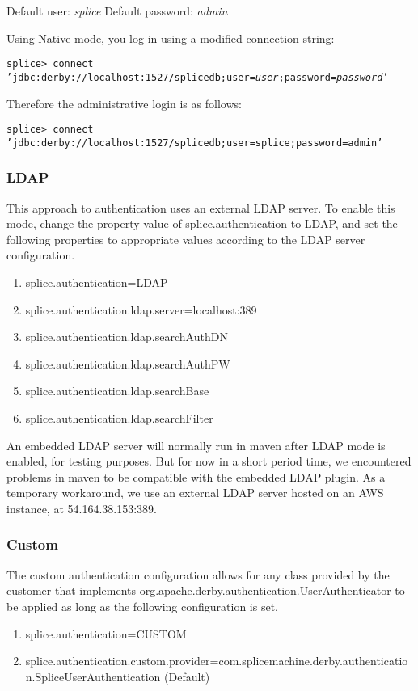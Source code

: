 Default user:  \emph{splice}    
Default password: \emph{admin}

Using Native mode, you log in using a modified connection string:

\texttt{splice> connect 'jdbc:derby://localhost:1527/splicedb;user=\emph{user};password=\emph{password}'}

Therefore the administrative login is as follows:

\texttt{splice> connect 'jdbc:derby://localhost:1527/splicedb;user=splice;password=admin'}

\subsubsection{LDAP}
This approach to authentication uses an external LDAP server. To enable this mode, change the property value of splice.authentication to LDAP, and set the following properties to appropriate values according to the LDAP server configuration. 
\begin{enumerate}
        \item splice.authentication=LDAP
        \item splice.authentication.ldap.server=localhost:389
        \item splice.authentication.ldap.searchAuthDN
        \item splice.authentication.ldap.searchAuthPW
        \item splice.authentication.ldap.searchBase
        \item splice.authentication.ldap.searchFilter
\end{enumerate}
An embedded LDAP server will normally run in maven after LDAP mode is enabled, for testing purposes. But for now in a short period time, we encountered problems in maven to be compatible with the embedded LDAP plugin. As a temporary workaround, we use an external LDAP server hosted on an AWS instance, at 54.164.38.153:389. 

\subsubsection{Custom}

The custom authentication
configuration allows for any
class provided by the customer
that implements org.apache.derby.authentication.UserAuthenticator
to be applied as long as the following configuration is set.

\begin{enumerate}
        \item splice.authentication=CUSTOM
        \item   splice.authentication.custom.provider=com.splicemachine.derby.authentication.SpliceUserAuthentication (Default)
\end{enumerate}

